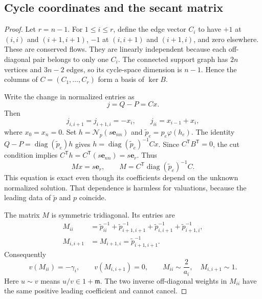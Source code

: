 \documentclass[11pt,a4paper]{article}
\numberwithin{equation}{section}
\theoremstyle{definition}
\newcommand{\mm}{\mathfrak m}
\newcommand{\NN}{\mathcal N}
\newcommand{\diag}{\operatorname{diag}}
\newcommand{\ph}{\varphi}
\begin{document}
\subsection{Cycle coordinates and the secant matrix}
\begin{proof}
Let $r=n-1$. For $1\leq i\leq r$, define the edge vector $C_i$ to
have $+1$ at $(i,i)$ and $(i+1,i+1)$, $-1$ at $(i,i+1)$ and
$(i+1,i)$, and zero elsewhere. These are conserved flows. They are
linearly independent because each off-diagonal pair belongs to only
one $C_i$. The connected support graph has $2n$ vertices and
$3n-2$ edges, so its cycle-space dimension is $n-1$. Hence the
columns of $C=(C_1,\ldots,C_r)$ form a basis of $\ker B$.

Write the change in normalized entries as
\begin{equation}\label{scale:eq:flowcoordinates}
 j=Q-P=Cx.
\end{equation}
Then
\[
 j_{i,i+1}=j_{i+1,i}=-x_i,\qquad
 j_{ii}=x_{i-1}+x_i,
\]
where $x_0=x_n=0$.
Set $h=\NN_p(s\mathbf e_{nn})$ and
$\widetilde p_e=p_e\ph(h_e)$. The identity
$Q-P=\diag(\widetilde p_e)h$ gives
$h=\diag(\widetilde p_e)^{-1}Cx$.
Since $C^{\mathsf T}B^{\mathsf T}=0$, the cut condition implies
$C^{\mathsf T}h=C^{\mathsf T}(s\mathbf e_{nn})=s\mathbf e_r$.
Thus
\begin{equation}\label{scale:eq:chainM}
 Mx=s\mathbf e_r,\qquad
 M=C^{\mathsf T}\diag(\widetilde p_e)^{-1}C.
\end{equation}
This equation is exact even though its coefficients depend on the
unknown normalized solution. That dependence is harmless for
valuations, because the leading data of $\widetilde p$ and $p$
coincide.

The matrix $M$ is symmetric tridiagonal. Its entries are
\begin{align*}
 M_{ii}&=\widetilde p_{ii}^{-1}
        +\widetilde p_{i+1,i+1}^{-1}
        +\widetilde p_{i,i+1}^{-1}
        +\widetilde p_{i+1,i}^{-1},\\
 M_{i,i+1}&=M_{i+1,i}=\widetilde p_{i+1,i+1}^{-1}.
\end{align*}
Consequently
\begin{equation}\label{scale:eq:chainMvals}
 v(M_{ii})=-\gamma_i,\qquad v(M_{i,i+1})=0,
 \qquad M_{ii}\sim\frac{2}{a_i},\quad M_{i,i+1}\sim1.
\end{equation}
Here $u\sim v$ means $u/v\in1+\mm$. The two inverse off-diagonal
weights in $M_{ii}$ have the same positive leading coefficient and
cannot cancel.


\end{proof}
\end{document}
